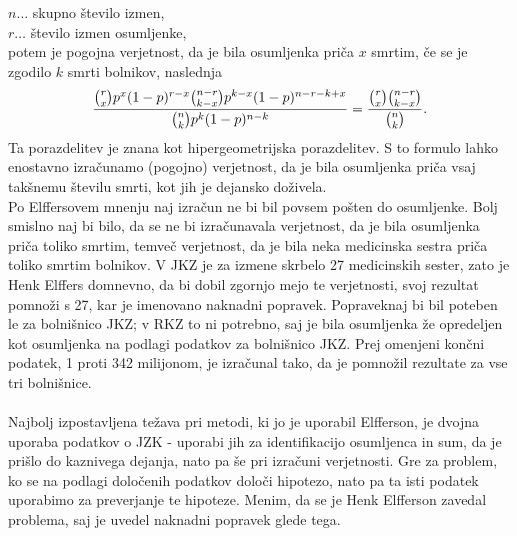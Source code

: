 \documentclass[mat1, tisk]{fmfdelo}
\theoremstyle{definition} %
\theoremstyle{trditev} %
\theoremstyle{izrek}
\begin{document}
$n \dots$ skupno število izmen,\\
$r \dots$ število izmen osumljenke, \\
potem je pogojna verjetnost, da je bila osumljenka priča $x$ smrtim, če se je zgodilo $k$ smrti bolnikov, naslednja 
\begin{equation}\label{eq:l_pogojna}
    \frac{\binom{r}{x}p^x(1-p)^{r-x}\binom{n-r}{k-x}p^{k-x}(1-p)^{n-r-k+x}}{\binom{n}{k}p^k(1-p)^{n-k}} = \frac{\binom{r}{x}\binom{n-r}{k-x}}{\binom{n}{k}}.\vspace{2mm}
\end{equation}
Ta porazdelitev je znana kot hipergeometrijska porazdelitev. S to formulo lahko enostavno izračunamo (pogojno) verjetnost, da je bila osumljenka 
priča vsaj takšnemu številu smrti, kot jih je dejansko doživela.\\
Po Elffersovem mnenju naj izračun ne bi bil povsem pošten do osumljenke. Bolj smislno naj bi bilo, da se ne bi izračunavala verjetnost, da je 
bila osumljenka priča toliko smrtim, temveč verjetnost, da je bila neka medicinska sestra priča toliko smrtim bolnikov. V JKZ je za izmene skrbelo 
27 medicinskih sester, zato je Henk Elffers domnevno, da bi dobil zgornjo mejo te verjetnosti, svoj rezultat pomnoži s 27, kar je imenovano 
naknadni popravek. Popraveknaj bi bil poteben le za bolnišnico JKZ; v RKZ to ni potrebno, saj je bila osumljenka že opredeljen kot osumljenka 
na podlagi podatkov za bolnišnico JKZ. Prej omenjeni končni podatek, 1 proti 342 milijonom, je izračunal tako, da je pomnožil rezultate za vse 
tri bolnišnice.\\\\
Najbolj izpostavljena težava pri metodi, ki jo je uporabil Elfferson, je dvojna uporaba podatkov o JZK - uporabi jih za identifikacijo osumljenca 
in sum, da je prišlo do kaznivega dejanja, nato pa še pri izračuni verjetnosti. Gre za problem, ko se na podlagi določenih podatkov določi hipotezo, nato 
pa ta isti podatek uporabimo za preverjanje te hipoteze. Menim, da se je Henk Elfferson zavedal problema, saj je uvedel naknadni popravek glede tega. 

\end{document}
